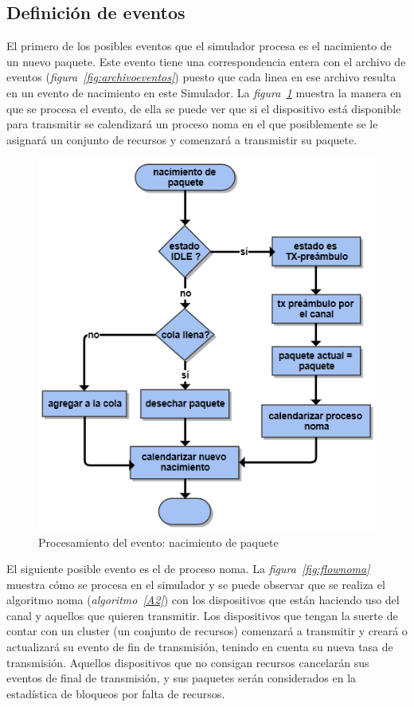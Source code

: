 \subsection{Definición de eventos}

El primero de los posibles eventos que el simulador procesa es el nacimiento de un nuevo paquete. Este evento tiene una correspondencia entera con el archivo de eventos (\textit{figura~\ref{fig:archivoeventos}}) puesto que cada linea en ese archivo resulta en un evento de nacimiento en este Simulador. La \textit{figura~\ref{fig:flownacimiento}} muestra la manera en que se procesa el evento, de ella se puede ver que si el dispositivo está disponible para transmitir se calendizará un proceso noma en el que posiblemente se le asignará un conjunto de recursos y comenzará a transmistir su paquete.\newline

\begin{figure}[th]
    \centering
    \includegraphics[scale=.7]{Figures/flownacimiento.png}
    \decoRule
    \caption[Procesamiento del evento: nacimiento de paquete]{Procesamiento del evento: nacimiento de paquete}
    \label{fig:flownacimiento}
\end{figure}

El siguiente posible evento es el de proceso noma. La \textit{figura~\ref{fig:flownoma}} muestra cómo se procesa en el simulador y se puede observar que se realiza el algoritmo noma (\textit{algoritmo~\ref{A2}}) con los dispositivos que están haciendo uso del canal y aquellos que quieren transmitir. Los dispositivos que tengan la suerte de contar con un cluster (un conjunto de recursos) comenzará a transmitir y creará o actualizará su evento de fin de transmisión, tenindo en cuenta su nueva tasa de transmisión. Aquellos dispositivos que no consigan recursos cancelarán sus eventos de final de transmisión, y sus paquetes serán considerados en la estadística de bloqueos por falta de recursos. \newline

